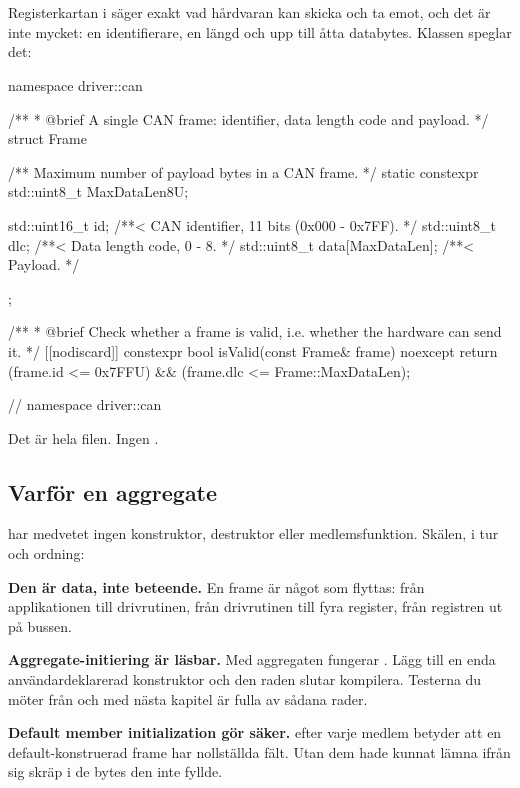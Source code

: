 \section{\texorpdfstring{}{driver::can::Frame}}
\label{sec:framecls}

Registerkartan i  säger exakt vad hårdvaran kan skicka och ta emot, och det är inte
mycket: en identifierare, en längd och upp till åtta databytes. Klassen speglar det:

\begin{cppcode}
namespace driver::can
{
/**
 * @brief A single CAN frame: identifier, data length code and payload.
 */
struct Frame
{
    /** Maximum number of payload bytes in a CAN frame. */
    static constexpr std::uint8_t MaxDataLen{8U};

    std::uint16_t id{};               /**< CAN identifier, 11 bits (0x000 - 0x7FF). */
    std::uint8_t  dlc{};              /**< Data length code, 0 - 8. */
    std::uint8_t  data[MaxDataLen]{}; /**< Payload. */
};

/**
 * @brief Check whether a frame is valid, i.e. whether the hardware can send it.
 */
[[nodiscard]] constexpr bool isValid(const Frame& frame) noexcept
{
    return (frame.id <= 0x7FFU) && (frame.dlc <= Frame::MaxDataLen);
}

} // namespace driver::can
\end{cppcode}

Det är hela filen. Ingen .

\subsection{Varför en aggregate}

 har medvetet ingen konstruktor, destruktor eller medlemsfunktion. Skälen, i tur och
ordning:

\textbf{Den är data, inte beteende.} En frame är något som flyttas: från applikationen till
drivrutinen, från drivrutinen till fyra register, från registren ut på bussen.

\textbf{Aggregate-initiering är läsbar.} Med aggregaten fungerar
. Lägg till en enda användardeklarerad konstruktor
och den raden slutar kompilera. Testerna du möter från och med nästa kapitel är fulla av sådana
rader.

\textbf{Default member initialization gör  säker.} \code{{}} efter varje medlem
betyder att en default-konstruerad frame har nollställda fält. Utan dem hade 
kunnat lämna ifrån sig skräp i de bytes den inte fyllde.

